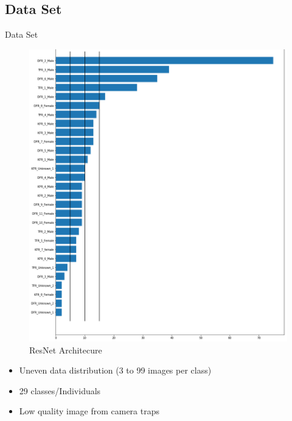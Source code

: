 \documentclass[10pt]{beamer}
\begin{document}
\subsection{Data Set}
\begin{frame}{Data Set}
	\begin{minipage}[c]{0.48\linewidth}
		\centering
		\begin{figure}
			\includegraphics[width=\linewidth,height=.8\textheight,keepaspectratio]{images/Data_dist_leo_lines_sorted_hori.png}
			\caption{ResNet Architecure}
		\end{figure}
	\end{minipage}
	\hfill
	\begin{minipage}[c]{0.48\linewidth}
		\begin{itemize}
			\item Uneven data distribution (3 to 99 images per class)
			\item 29 classes/Individuals
			\item Low quality image from camera traps
		\end{itemize}
	\end{minipage}
\end{frame}
\end{document}
